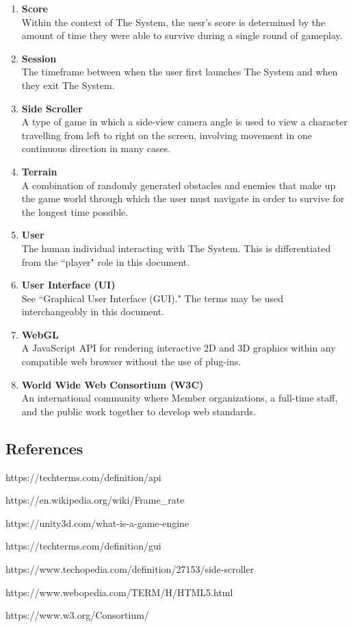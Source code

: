 \documentclass[12pt]{report}
\newenvironment{reqlist}{
	\renewcommand{\labelenumi}{\tab\thesubsection.\arabic{enumi}}
	\renewcommand{\labelenumii}{\thesubsection.\arabic{enumi}.\arabic{enumii}}
	\begin{enumerate}[itemsep = 1pt, parsep = 0pt, leftmargin = *]
}{\end{enumerate}}
\begin{document}
\begin{reqlist}
			\item \textbf{Score} \\ Within the context of The System, the uesr's score is determined by the amount of time they were able to survive during a single round of gameplay.
			\item \textbf{Session} \\ The timeframe between when the user first launches The System and when they exit The System.
			\item \textbf{Side Scroller} \\ A type of game in which a side-view camera angle is used to view a character travelling from left to right on the screen, involving movement in one continuous direction in many cases.
			\item \textbf{Terrain} \\ A combination of randomly generated obstacles and enemies that make up the game world through which the user must navigate in order to survive for the longest time possible.
			\item \textbf{User} \\ The human individual interacting with The System. This is differentiated from the ``player" role in this document.
			\item \textbf{User Interface (UI)} \\ See ``Graphical User Interface (GUI)." The terms may be used interchangeably in this document.
			\item \textbf{WebGL} \\ A JavaScript API for rendering interactive 2D and 3D graphics within any compatible web browser without the use of plug-ins.
			\item \textbf{World Wide Web Consortium (W3C)} \\ An international community where Member organizations, a full-time staff, and the public work together to develop web standards. 
		\end{reqlist}
	\subsection{References}
		\begin{reqlist}
			\small{
				\item https://techterms.com/definition/api
				\item https://en.wikipedia.org/wiki/Frame\_rate
				\item https://unity3d.com/what-is-a-game-engine
				\item https://techterms.com/definition/gui
				\item https://www.techopedia.com/definition/27153/side-scroller
				\item https://www.webopedia.com/TERM/H/HTML5.html
				\item https://www.w3.org/Consortium/
			}
		\end{reqlist}
\end{document}

